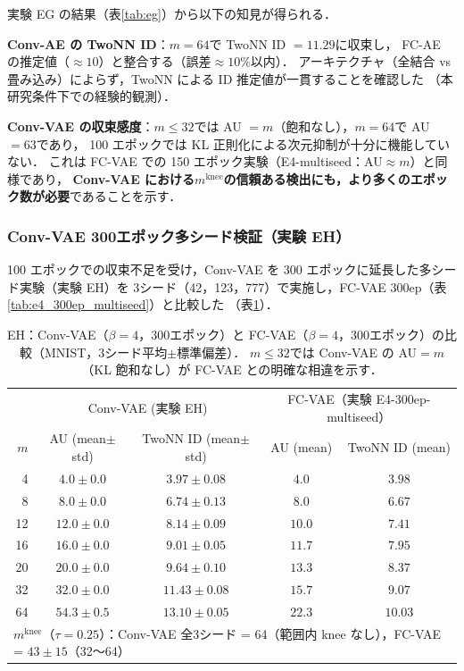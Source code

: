 \documentclass[11pt,a4paper]{jsarticle}
\newcommand{\mknee}{m^{\mathrm{knee}}}
\begin{document}
実験 EG の結果（表\ref{tab:eg}）から以下の知見が得られる．

\textbf{Conv-AE の TwoNN ID}：$m = 64$で TwoNN ID $= 11.29$に収束し，
FC-AE の推定値（$\approx 10$）と整合する（誤差$\approx 10\%$以内）．
アーキテクチャ（全結合 vs 畳み込み）によらず，TwoNN による ID 推定値が一貫することを確認した
（本研究条件下での経験的観測）．

\textbf{Conv-VAE の収束感度}：$m \leq 32$では AU $= m$（飽和なし），$m = 64$で AU $= 63$であり，
100 エポックでは KL 正則化による次元抑制が十分に機能していない．
これは FC-VAE での 150 エポック実験（E4-multiseed：AU$\approx m$）と同様であり，
\textbf{Conv-VAE における$\mknee$の信頼ある検出にも，より多くのエポック数が必要}であることを示す．

\subsubsection{Conv-VAE 300エポック多シード検証（実験 EH）}\label{sec:exp_conv_300ep}

100 エポックでの収束不足を受け，Conv-VAE を 300 エポックに延長した多シード実験（実験 EH）を
3シード（42，123，777）で実施し，FC-VAE 300ep（表\ref{tab:e4_300ep_multiseed}）と比較した
（表\ref{tab:eh_conv_vae}）．

\begin{table}[H]
\centering
\caption{EH：Conv-VAE（$\beta=4$，300エポック）と FC-VAE（$\beta=4$，300エポック）の比較（MNIST，3シード平均$\pm$標準偏差）．
$m \leq 32$では Conv-VAE の AU$=m$（KL 飽和なし）が FC-VAE との明確な相違を示す．}
\label{tab:eh_conv_vae}
\small
\begin{tabular}{r cc cc}
\toprule
 & \multicolumn{2}{c}{Conv-VAE (実験 EH)} & \multicolumn{2}{c}{FC-VAE（実験 E4-300ep-multiseed）} \\
$m$ & AU (mean$\pm$std) & TwoNN ID (mean$\pm$std) & AU (mean) & TwoNN ID (mean) \\
\midrule
 4 & $4.0 \pm 0.0$ & $3.97 \pm 0.08$ & $4.0$ & $3.98$ \\
 8 & $8.0 \pm 0.0$ & $6.74 \pm 0.13$ & $8.0$ & $6.67$ \\
12 & $12.0 \pm 0.0$ & $8.14 \pm 0.09$ & $10.0$ & $7.41$ \\
16 & $16.0 \pm 0.0$ & $9.01 \pm 0.05$ & $11.7$ & $7.95$ \\
20 & $20.0 \pm 0.0$ & $9.64 \pm 0.10$ & $13.3$ & $8.37$ \\
32 & $32.0 \pm 0.0$ & $11.43 \pm 0.08$ & $15.7$ & $9.07$ \\
64 & $54.3 \pm 0.5$ & $13.10 \pm 0.05$ & $22.3$ & $10.03$ \\
\midrule
\multicolumn{5}{l}{$\mknee$（$\tau=0.25$）：Conv-VAE 全3シード = 64（範囲内 knee なし），FC-VAE = $43 \pm 15$（32〜64）} \\
\bottomrule
\end{tabular}
\end{table}
\end{document}
